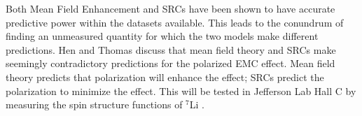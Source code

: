 Both Mean Field Enhancement and SRCs have been shown to have accurate predictive power within the datasets available. This leads to the conundrum of finding an unmeasured quantity for which the two models make different predictions. Hen \cite{HenSRC} and Thomas \cite{ThomasSRC} discuss that mean field theory and SRCs make seemingly contradictory predictions for the polarized EMC effect. Mean field theory predicts that polarization will enhance the effect; SRCs predict the polarization to minimize the effect. This will be tested in Jefferson Lab Hall C by measuring the spin structure functions of $^7$Li \cite{CLASspinEMC}.